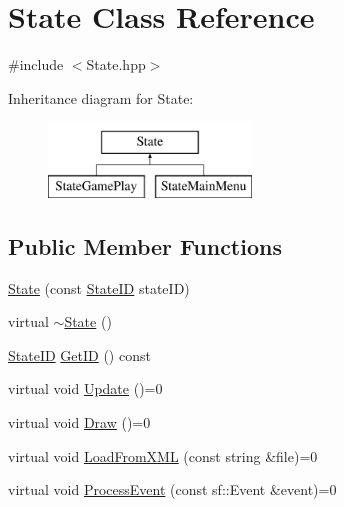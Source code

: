 \hypertarget{class_state}{\section{State Class Reference}
\label{class_state}
}


{\ttfamily \#include $<$State.\-hpp$>$}

Inheritance diagram for State\-:\begin{figure}[H]
\begin{center}
\leavevmode
\includegraphics[height=2.000000cm]{class_state}
\end{center}
\end{figure}
\subsection*{Public Member Functions}
\begin{DoxyCompactItemize}
\item 
\hyperlink{class_state_a4da3d6c4c175efa74f87a1d413a4486b}{State} (const \hyperlink{_state_8hpp_a905494cc15ee9757a813dbfe4b1072fe}{State\-I\-D} state\-I\-D)
\item 
virtual \hyperlink{class_state_afab438d92b90dc18d194dbd9c9c8bab3}{$\sim$\-State} ()
\item 
\hyperlink{_state_8hpp_a905494cc15ee9757a813dbfe4b1072fe}{State\-I\-D} \hyperlink{class_state_ab7022716d4d0c7aec82dbdd90e1e039e}{Get\-I\-D} () const 
\item 
virtual void \hyperlink{class_state_a43d4ca30d927c023316c058b700c0716}{Update} ()=0
\item 
virtual void \hyperlink{class_state_a8b0cdb0e7450a9bb3580a33dfbe4d981}{Draw} ()=0
\item 
virtual void \hyperlink{class_state_a8c96aac63e62b9b6bb491cae071d08f2}{Load\-From\-X\-M\-L} (const string \&file)=0
\item 
virtual void \hyperlink{class_state_aac4126b251b0c55d5c934982310c80ae}{Process\-Event} (const sf\-::\-Event \&event)=0
\end{DoxyCompactItemize}
